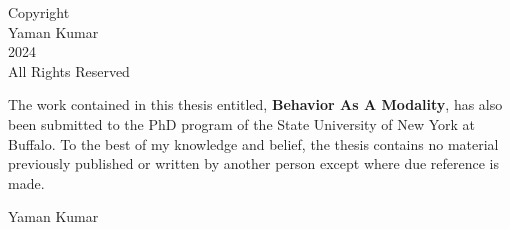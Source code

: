 
\vspace*{\fill}
\begin{center}
    {\large Copyright} \\ %
    \vspace{0.5cm} %
    {\large Yaman Kumar} \\
    \vspace{0.5cm}
    {\large 2024} \\
    \vspace{0.5cm}
    {\large All Rights Reserved}
\end{center}
\vspace*{\fill} %

\newpage

\certificate

\vspace*{0.5in}


\noindent  The work contained in this thesis entitled, \textbf{Behavior As A Modality}, has also been submitted to the PhD program of the State University of New York at Buffalo. To the best of my knowledge and belief, the thesis contains no material previously published or written by another person except where due reference is made.

\vspace*{0.5in}

\noindent Yaman Kumar

\vspace*{1in}

